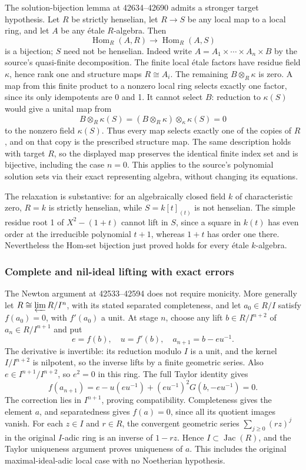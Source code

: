 The solution-bijection lemma at 42634--42690 admits a stronger target hypothesis. Let \(R\) be strictly henselian, let \(R\to S\) be any local map to a local ring, and let \(A\) be any étale \(R\)-algebra. Then \[
\operatorname{Hom}_R(A,R)\longrightarrow
\operatorname{Hom}_R(A,S)
\] is a bijection; \(S\) need not be henselian. Indeed write \(A=A_1\times\cdots\times A_n\times B\) by the source's quasi-finite decomposition. The finite local étale factors have residue field \(\kappa\), hence rank one and structure maps \(R\cong A_i\). The remaining \(B\otimes_R\kappa\) is zero. A map from this finite product to a nonzero local ring selects exactly one factor, since its only idempotents are 0 and 1. It cannot select \(B\): reduction to \(\kappa(S)\) would give a unital map from \[
B\otimes_R\kappa(S)
=(B\otimes_R\kappa)\otimes_\kappa\kappa(S)=0
\] to the nonzero field \(\kappa(S)\). Thus every map selects exactly one of the copies of \(R\), and on that copy is the prescribed structure map. The same description holds with target \(R\), so the displayed map preserves the identical finite index set and is bijective, including the case \(n=0\). This applies to the source's polynomial solution sets via their exact representing algebra, without changing its equations.

The relaxation is substantive: for an algebraically closed field \(k\) of characteristic zero, \(R=k\) is strictly henselian, while \(S=k[t]_{(t)}\) is not henselian. The simple residue root 1 of \(X^2-(1+t)\) cannot lift in \(S\), since a square in \(k(t)\) has even order at the irreducible polynomial \(t+1\), whereas \(1+t\) has order one there. Nevertheless the Hom-set bijection just proved holds for every étale \(k\)-algebra.

\subsubsection{Complete and nil-ideal lifting with exact errors}\label{algebra-proof-058-complete-and-nil-ideal-lifting-with-exact-errors}

The Newton argument at 42533--42594 does not require monicity. More generally let \(R\cong\varprojlim R/I^n\), with its stated separated completeness, and let \(a_0\in R/I\) satisfy \(f(a_0)=0\), with \(f'(a_0)\) a unit. At stage \(n\), choose any lift \(b\in R/I^{n+2}\) of \(a_n\in R/I^{n+1}\) and put \[
e=f(b),\quad u=f'(b),\quad a_{n+1}=b-eu^{-1}.
\] The derivative is invertible: its reduction modulo \(I\) is a unit, and the kernel \(I/I^{n+2}\) is nilpotent, so the inverse lifts by a finite geometric series. Also \(e\in I^{n+1}/I^{n+2}\), so \(e^2=0\) in this ring. The full Taylor identity gives \[
f(a_{n+1})=e-u(eu^{-1})
              +(eu^{-1})^2G(b,-eu^{-1})=0.
\] The correction lies in \(I^{n+1}\), proving compatibility. Completeness gives the element \(a\), and separatedness gives \(f(a)=0\), since all its quotient images vanish. For each \(z\in I\) and \(r\in R\), the convergent geometric series \(\sum_{j\ge0}(rz)^j\) in the original \(I\)-adic ring is an inverse of \(1-rz\). Hence \(I\subset\operatorname{Jac}(R)\), and the Taylor uniqueness argument proves uniqueness of \(a\). This includes the original maximal-ideal-adic local case with no Noetherian hypothesis.

